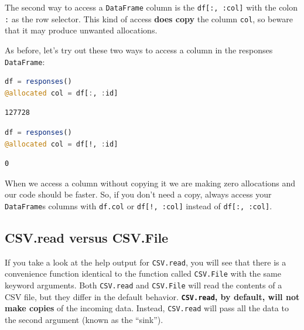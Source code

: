 \documentclass[
  notoc %
]{tufte-book}
\newcommand{\passthrough}[1]{#1}
\begin{document}
The second way to access a \passthrough{\lstinline!DataFrame!} column is
the \passthrough{\lstinline!df[:, :col]!} with the colon
\passthrough{\lstinline!:!} as the row selector. This kind of access
\textbf{does copy} the column \passthrough{\lstinline!col!}, so beware
that it may produce unwanted allocations.

As before, let's try out these two ways to access a column in the
responses \passthrough{\lstinline!DataFrame!}:

\begin{lstlisting}[language=Julia]
df = responses()
@allocated col = df[:, :id]
\end{lstlisting}

\begin{lstlisting}
127728
\end{lstlisting}

\begin{lstlisting}[language=Julia]
df = responses()
@allocated col = df[!, :id]
\end{lstlisting}

\begin{lstlisting}
0
\end{lstlisting}

When we access a column without copying it we are making zero
allocations and our code should be faster. So, if you don't need a copy,
always access your \passthrough{\lstinline!DataFrame!}s columns with
\passthrough{\lstinline!df.col!} or
\passthrough{\lstinline"df[!, :col]"} instead of
\passthrough{\lstinline!df[:, :col]!}.

\hypertarget{sec:df_performance_csv_read_file}{%
\subsection{CSV.read versus
CSV.File}\label{sec:df_performance_csv_read_file}}

If you take a look at the help output for
\passthrough{\lstinline!CSV.read!}, you will see that there is a
convenience function identical to the function called
\passthrough{\lstinline!CSV.File!} with the same keyword arguments. Both
\passthrough{\lstinline!CSV.read!} and
\passthrough{\lstinline!CSV.File!} will read the contents of a CSV file,
but they differ in the default behavior.
\textbf{\passthrough{\lstinline!CSV.read!}, by default, will not make
copies} of the incoming data. Instead,
\passthrough{\lstinline!CSV.read!} will pass all the data to the second
argument (known as the ``sink'').
\end{document}
